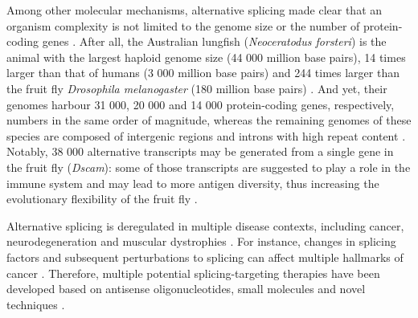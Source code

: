 Among other molecular mechanisms, alternative splicing made clear that an organism complexity is not limited to the genome size or the number of protein-coding genes \cite{lee:2015tt}. After all, the Australian lungfish (\emph{Neoceratodus forsteri}) is the animal with the largest haploid genome size (44 000 million base pairs), 14 times larger than that of humans (3 000 million base pairs) and 244 times larger than the fruit fly \emph{Drosophila melanogaster} (180 million base pairs) \cite{meyer:2021vn,adams:2000tj,myers:2000wk}. And yet, their genomes harbour 31 000, 20 000 and 14 000 protein-coding genes, respectively, numbers in the same order of magnitude, whereas the remaining genomes of these species are composed of intergenic regions and introns with high repeat content \cite{meyer:2021vn,adams:2000tj,myers:2000wk}. Notably, 38 000 alternative transcripts may be generated from a single gene in the fruit fly (\emph{Dscam}): some of those transcripts are suggested to play a role in the immune system and may lead to more antigen diversity, thus increasing the evolutionary flexibility of the fruit fly  \cite{schmucker:2000wf}.



Alternative splicing is deregulated in multiple disease contexts, including cancer, neurodegeneration and muscular dystrophies \cite{gallego-paez:2017wc,montes:2019ww}. For instance, changes in splicing factors and subsequent  perturbations to splicing can affect multiple hallmarks of cancer \cite{zhang:2021wn}. Therefore, multiple potential splicing-targeting therapies have been developed based on antisense oligonucleotides, small molecules and novel techniques \cite{montes:2019ww}.



